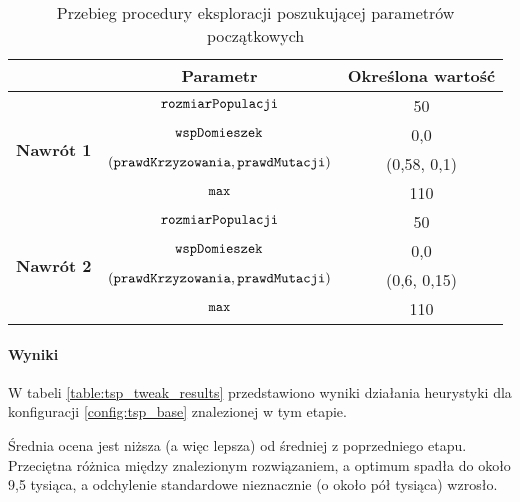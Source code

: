 \documentclass[./FM_mgr.tex]{subfiles}
\begin{document}
\begin{table}[H]
	\caption{Przebieg procedury eksploracji poszukującej parametrów początkowych \label{table:tsp_tweak_flow}}
	\centering
	\begin{tabular}{c|c|c|}
		\cline{2-3}
		& {\bf Parametr}                                     & {\bf Określona wartość} \\ \hline
		\multicolumn{1}{|c|}{\multirow{4}{*}{{\bf Nawrót 1}}} & $\mathtt{rozmiarPopulacji}$                         & 50                      \\ \cline{2-3} 
		\multicolumn{1}{|c|}{}                                & $\mathtt{wspDomieszek}$                             & 0,0                     \\ \cline{2-3} 
		\multicolumn{1}{|c|}{}                                & $(\mathtt{prawdKrzyzowania}, \mathtt{prawdMutacji})$ & (0,58, 0,1)             \\ \cline{2-3} 
		\multicolumn{1}{|c|}{}                                & $\mathtt{max}$                                      & 110                     \\ \hline \hline
		\multicolumn{1}{|c|}{\multirow{4}{*}{{\bf Nawrót 2}}} & $\mathtt{rozmiarPopulacji}$                         & 50                      \\ \cline{2-3} 
		\multicolumn{1}{|c|}{}                                & $\mathtt{wspDomieszek}$                             & 0,0                     \\ \cline{2-3} 
		\multicolumn{1}{|c|}{}                                & $(\mathtt{prawdKrzyzowania}, \mathtt{prawdMutacji})$ & (0,6, 0,15)             \\ \cline{2-3} 
		\multicolumn{1}{|c|}{}                                & $\mathtt{max}$                                      & 110                     \\ \hline
	\end{tabular}
\end{table}	

\paragraph{Wyniki}

W tabeli \ref{table:tsp_tweak_results} przedstawiono wyniki działania heurystyki dla konfiguracji \ref{config:tsp_base} znalezionej w tym etapie.

Średnia ocena jest niższa (a więc lepsza) od średniej z poprzedniego etapu.
Przeciętna różnica między znalezionym rozwiązaniem, a optimum spadła do około 9,5 tysiąca, a odchylenie standardowe nieznacznie (o około pół tysiąca) wzrosło.
\end{document}
